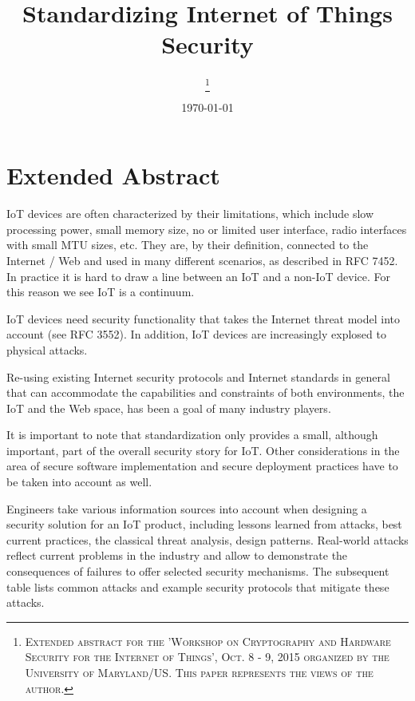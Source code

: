 \documentclass[peerreview, a4paper, draft, 7pt]{IEEEtran}
\begin{document}
\title{Standardizing Internet of Things Security}

\author{
\thanks{\textsc{
Extended abstract for the 'Workshop on Cryptography and Hardware Security for the Internet of Things', Oct. 8 - 9, 2015 organized by the University of Maryland/US. This paper represents the views of the author.}}
}

\date{\today}

\maketitle

\section{Extended Abstract}

IoT devices are often characterized by their limitations, which include slow processing power, small memory size, no or limited user interface, radio interfaces with small MTU sizes, etc. They are, by their definition, connected to the Internet / Web and used in many different scenarios, as described in RFC 7452. In practice it is hard to draw a line between an IoT and a non-IoT device. For this reason we see IoT is a continuum. 

IoT devices need security functionality that takes the Internet threat model into account (see RFC 3552). In addition, IoT devices are increasingly explosed to physical attacks. 

Re-using existing Internet security protocols and Internet standards in general that can accommodate the capabilities and constraints of both environments, the IoT and the Web space, has been a goal of many industry players. 

It is important to note that standardization only provides a small, although important, part of the overall security story for IoT. Other considerations in the area of secure software implementation and secure deployment practices have to be taken into account as well. 

Engineers take various information sources into account when designing a security solution for an IoT product, including lessons learned from attacks, best current practices, the classical threat analysis, design patterns. Real-world attacks reflect current problems in the industry and allow to demonstrate the consequences of failures to offer selected security mechanisms. The subsequent table lists common attacks and example security protocols that mitigate these attacks. 
\end{document}
